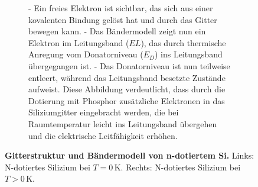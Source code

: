 {\begin{figure}[H]
\begin{minipage}[c]{0.48\textwidth}
\begin{figure}[H]
{                - Ein freies Elektron ist sichtbar, das sich aus einer kovalenten Bindung gelöst hat und durch das Gitter bewegen kann.  
                - Das Bändermodell zeigt nun ein Elektron im Leitungsband (\( EL \)), das durch thermische Anregung vom Donatorniveau (\( E_D \)) ins Leitungsband übergegangen ist.  
                - Das Donatorniveau ist nun teilweise entleert, während das Leitungsband besetzte Zustände aufweist.  
                Diese Abbildung verdeutlicht, dass durch die Dotierung mit Phosphor zusätzliche Elektronen in das Siliziumgitter eingebracht werden, die bei Raumtemperatur leicht ins Leitungsband übergehen und die elektrische Leitfähigkeit erhöhen.}
            \end{figure}
        \end{minipage}
        \caption{\textbf{Gitterstruktur und Bändermodell von n-dotiertem Si.} Links: N-dotiertes Silizium bei $T={0}\,\mathrm{K}$. Rechts: N-dotiertes Silizium bei $T>{0}\,\mathrm{K}$.}  
        \label{fig:GitterstrukturUndBaendermodellVonN-DotiertesSi}
    \end{figure}
}

%
%


